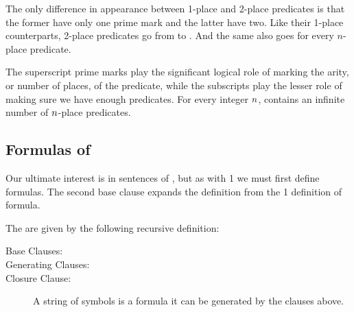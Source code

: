 The only difference in appearance between 1-place and 2-place predicates is that the former have only one prime mark and the latter have two. 
Like their 1-place counterparts, 2-place predicates go from  to .  And the same also goes for every $n$-place predicate.

The superscript prime marks play the significant logical role of marking the arity, or number of places, of the predicate, while the subscripts play the lesser role of making sure we have enough predicates.  For every integer $n$, \GQL{} contains an infinite number of $n$-place predicates. 

\subsection{Formulas of \GQL{}}\label{Formulas of GQL}
Our ultimate interest is in sentences of \GQL{}, but as with \GQL{}1 we must first define formulas. The second base clause expands the definition from the \GQL{}1 definition of formula.
\begin{majorILnc}{} The   are given by the following recursive definition:
\begin{description}
\item[Base Clauses:] \hfill{}
\item[Generating Clauses:] \hfill{}
\item[Closure Clause:] A string of symbols is a formula \Iff it can be generated by the clauses above.
\end{description}
\end{majorILnc}
